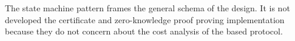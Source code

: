 
The state machine pattern frames the general schema of the design.
It is not developed the certificate and zero-knowledge proof proving implementation because they do not concern about the cost analysis of the based protocol.
